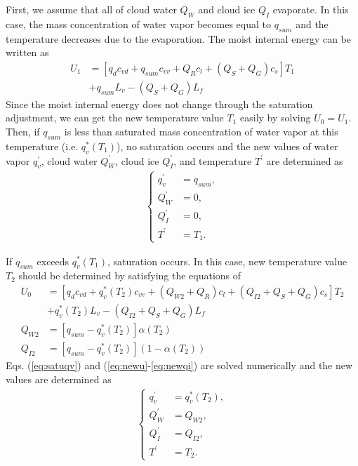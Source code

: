 First, we assume that all of cloud water $Q_{W}$ and cloud ice $Q_{I}$ evaporate. In this case, the mass concentration of water vapor becomes equal to $q_{sum}$ and the temperature decreases due to the evaporation. The moist internal energy can be written as
\begin{align}
  U_{1}&=[q_{d}c_{vd}+q_{sum}c_{vv}+Q_{R}c_{l}+(Q_{S}+Q_{G})c_{s}]T_{1} \nonumber \\ 
  &+q_{sum}L_{v}-(Q_{S}+Q_{G})L_{f}
\end{align}
Since the moist internal energy does not change through the saturation adjustment, we can get the new temperature value $T_{1}$ easily by solving $U_{0}=U_{1}$. Then, if $q_{sum}$ is less than saturated mass concentration of water vapor at this temperature (i.e. $q^{*}_{v} (T_{1})$), no saturation occurs and the new values of water vapor $q^{\prime}_{v}$, cloud water $Q^{\prime}_{W}$, cloud ice $Q^{\prime}_{I}$, and temperature $T^{\prime}$ are determined as
\begin{align}
\begin{cases}
  q^{\prime}_{v} &= q_{sum}, \\
  Q^{\prime}_{W} &= 0, \\
  Q^{\prime}_{I} &= 0, \\
  T^{\prime} &= T_{1}.
\end{cases}
\end{align}

If $q_{sum}$ exceeds $q^{*}_{v} (T_{1})$, saturation occurs. In this case, new temperature value $T_{2}$ should be determined by satisfying the equations of
\begin{align}
  U_{0}&=[q_{d}c_{vd}+q^{*}_{v}(T_{2})c_{vv}+(Q_{W2}+Q_{R})c_{l}+(Q_{I2}+Q_{S}+Q_{G})c_{s}]T_{2} \nonumber \\ 
  &+q^{*}_{v}(T_{2})L_{v}-(Q_{I2}+Q_{S}+Q_{G})L_{f}\label{eq:newu} \\
  Q_{W2}&=[q_{sum}-q^{*}_{v}(T_{2})]\alpha (T_{2})\label{eq:newqw} \\
  Q_{I2}&=[q_{sum}-q^{*}_{v}(T_{2})](1-\alpha (T_{2}))\label{eq:newqi}
\end{align}
Eqs. (\ref{eq:satuqv}) and (\ref{eq:newu}-\ref{eq:newqi}) are solved numerically and the new values are determined as
\begin{align}
\begin{cases}
  q^{\prime}_{v} &= q^{*}_{v}(T_{2}), \\
  Q^{\prime}_{W} &= Q_{W2}, \\
  Q^{\prime}_{I} &= Q_{I2}, \\
  T^{\prime} &= T_{2}.
\end{cases}
\end{align}

